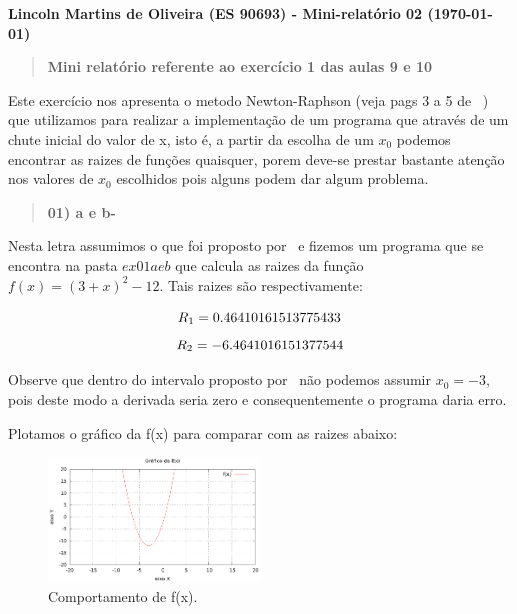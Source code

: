 \documentclass[a4wide]{report}
\begin{document}
\noindent
{\bf Lincoln Martins de Oliveira (ES 90693) - Mini-relatório 02 (\today)}

\begin{quote}

\centering

\bf Mini relatório referente ao exercício 1 das aulas 9 e 10

\end{quote}
\vspace{0.5cm}


      Este exercício nos apresenta o metodo Newton-Raphson (veja pags 3 a 5 de ~\cite{Metodos}) que utilizamos para realizar
a implementação de um programa que através de um chute inicial do valor de x, isto é, a partir da escolha de um $x_0$ podemos 
encontrar as raizes de funções quaisquer, porem deve-se prestar bastante atenção nos valores de  $x_0$ escolhidos pois alguns 
podem dar algum problema. 


\begin{quote}


\bf 01) a e b-

\end{quote}

Nesta letra assumimos o que foi proposto por~\cite{roteiro} e fizemos um programa que se encontra na pasta $ex 01 a e b$ que calcula as
raizes da função $ f(x) = (3 + x)^2 - 12$. Tais raizes são respectivamente:

\begin{equation}
\centering
R_1= 0.46410161513775433    
\label{raiz1}
\end{equation}
\begin{equation}
\centering
R_2= -6.4641016151377544     
\label{raiz2}
\end{equation}

Observe que dentro do intervalo proposto por~\cite{roteiro} não podemos assumir $x_0 = -3$, 
pois deste modo a derivada seria zero e consequentemente o programa daria erro.

Plotamos o gráfico da f(x) para comparar com as raizes abaixo:
\begin{figure}[h]
\centering
\includegraphics[width=0.5\textwidth]{grafico_ex_01_a}
\caption{Comportamento de f(x).}
\label{ex01a1.1}
\end{figure}
\end{document}
